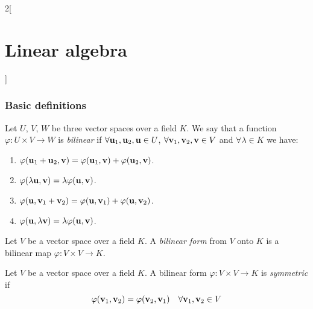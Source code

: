 \documentclass[../../../main.tex]{subfiles}
\begin{document}
\begin{multicols}{2}[\section{Linear algebra}]
  \subsubsection{Basic definitions}
  \begin{definition}
    Let $U$, $V$, $W$ be three vector spaces over a field $K$. We say that a function $\varphi:U\times V\rightarrow W$ is \emph{bilinear} if $\forall\boldsymbol{\mathrm{u}}_1,\boldsymbol{\mathrm{u}}_2,\boldsymbol{\mathrm{u}}\in U$, $\forall \boldsymbol{\mathrm{v}}_1,\boldsymbol{\mathrm{v}}_2,\boldsymbol{\mathrm{v}}\in V$ and $\forall\lambda\in K$ we have:
    \begin{enumerate}
      \item $\varphi(\boldsymbol{\mathrm{u}}_1+\boldsymbol{\mathrm{u}}_2,\boldsymbol{\mathrm{v}})=\varphi(\boldsymbol{\mathrm{u}}_1,\boldsymbol{\mathrm{v}})+\varphi(\boldsymbol{\mathrm{u}}_2,\boldsymbol{\mathrm{v}})$.
      \item $\varphi(\lambda \boldsymbol{\mathrm{u}},\boldsymbol{\mathrm{v}})=\lambda \varphi(\boldsymbol{\mathrm{u}},\boldsymbol{\mathrm{v}})$.
      \item $\varphi(\boldsymbol{\mathrm{u}},\boldsymbol{\mathrm{v}}_1+\boldsymbol{\mathrm{v}}_2)=\varphi(\boldsymbol{\mathrm{u}},\boldsymbol{\mathrm{v}}_1)+\varphi(\boldsymbol{\mathrm{u}},\boldsymbol{\mathrm{v}}_2)$.
      \item $\varphi(\boldsymbol{\mathrm{u}},\lambda \boldsymbol{\mathrm{v}})=\lambda \varphi(\boldsymbol{\mathrm{u}},\boldsymbol{\mathrm{v}})$.
    \end{enumerate}
  \end{definition}
  \begin{definition}
    Let $V$ be a vector space over a field $K$. A \emph{bilinear form} from $V$ onto $K$ is a bilinear map $\varphi:V\times V\rightarrow K$.
  \end{definition}
  \begin{definition}
    Let $V$ be a vector space over a field $K$. A bilinear form $\varphi:V\times V\rightarrow K$ is \emph{symmetric} if $$\varphi(\boldsymbol{\mathrm{v}}_1,\boldsymbol{\mathrm{v}}_2)=\varphi(\boldsymbol{\mathrm{v}}_2,\boldsymbol{\mathrm{v}}_1)\quad\forall \boldsymbol{\mathrm{v}}_1,\boldsymbol{\mathrm{v}}_2\in V$$
  \end{definition}

\end{multicols}
\end{document}
